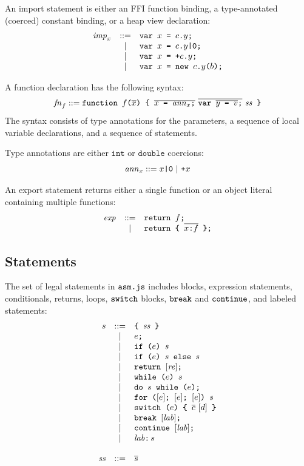 \documentclass{article}
\newcommand{\funcall}[2]{{#1}\mathjs{(}{#2}\mathjs{)}}
\newcommand{\seq}[1]{\overline{{#1}}}
\newcommand{\mathjs}[1]{\mbox{\texttt{{#1}}}}
\newcommand{\return}[1]{\mathjs{return }{#1}\mathjs{;}}
\newcommand{\fun}[3]{\mathjs{function }{#1}\mathjs{(}{#2}\mathjs{) \char123{} }{#3}\mathjs{ \char125{}}}
\newcommand{\var}[1]{\mathjs{var }{#1}\mathjs{;}}
\newcommand{\while}[2]{\mathjs{while (}{#1}\mathjs{) }{#2}}
\newcommand{\dowhile}[2]{\mathjs{do }{#1}\mathjs{ while (}{#2}\mathjs{);}}
\newcommand{\for}[4]{\mathjs{for (}{#1}\mathjs{; }{#2}\mathjs{; }{#3}\mathjs{) }{#4}}
\newcommand{\switch}[2]{\mathjs{switch (}{#1}\mathjs{) \char123{} }{#2}\mathjs{ \char125{}}}
\newcommand{\brkl}[1]{\mathjs{break }{#1}\mathjs{;}}
\newcommand{\contl}[1]{\mathjs{continue }{#1}\mathjs{;}}
\newcommand{\lab}[2]{{#1}\mathjs{:}\,{#2}}
\newcommand{\ifone}[2]{\mathjs{if (}{#1}\mathjs{) }{#2}}
\newcommand{\iftwo}[3]{\mathjs{if (}{#1}\mathjs{) }{#2}\mathjs{ else }{#3}}
\newcommand{\block}[1]{\mathjs{\char123{} }{#1}\mathjs{ \char125{}}}
\newcommand{\double}{\mathtt{double}}
\newcommand{\todouble}[1]{\mathjs{+}{#1}}
\renewcommand{\int}{\mathtt{int}}
\begin{document}
An import statement is either an FFI function binding, a
type-annotated (coerced) constant binding, or a heap view declaration:
\[
\begin{array}{rcl}
\mathit{imp}_x  & ::= & \var{x \mathjs{ = } c\mathjs{.}y} \\
                &  |  & \var{x \mathjs{ = } c\mathjs{.}y\mathjs{|0}} \\
                &  |  & \var{x \mathjs{ = } \mathjs{+}c\mathjs{.}y} \\
                &  |  & \var{x \mathjs{ = } \mathjs{new }\funcall{c\mathjs{.}y}{b}} \\
\end{array}
\]

A function declaration has the following syntax:
\[
\mathit{fn}_f ::= \fun{f}{\seq{x}}{\seq{x\mathjs{ = }\mathit{ann}_x\mathjs{;}}\ \seq{\var{\seq{y\mathjs{ = }v}}}\ \mathit{ss}}
\]
The syntax consists of type annotations for the parameters, a sequence
of local variable declarations, and a sequence of statements.

Type annotations are either $\int$ or $\double$ coercions:
\[
\mathit{ann}_x ::= x\mathjs{|0} ~|~ \todouble{x}
\]

An export statement returns either a single function or an object
literal containing multiple functions:
\[
\begin{array}{rcl}
\mathit{exp}    & ::= & \return{f} \\
                &  |  & \return{\mathjs{\char123{} } \seq{x \mathjs{:} f} \mathjs{ \char125{}}} \\
\end{array}
\]

\subsection{Statements}

The set of legal statements in $\mathjs{asm.js}$ includes blocks,
expression statements, conditionals, returns, loops, $\mathjs{switch}$
blocks, $\mathjs{break}$ and $\mathjs{continue}$, and labeled
statements:
\[
\begin{array}{rcl}
s & ::= & \block{\mathit{ss}} \\
  &  |  & e\mathjs{;} \\
  &  |  & \ifone{e}{s} \\
  &  |  & \iftwo{e}{s}{s} \\
  &  |  & \return{[\mathit{re}]} \\
  &  |  & \while{e}{s} \\
  &  |  & \dowhile{s}{e} \\
  &  |  & \for{[e]}{[e]}{[e]}{s} \\
  &  |  & \switch{e}{\seq{c}\ [d]} \\
  &  |  & \brkl{[\mathit{lab}]} \\
  &  |  & \contl{[\mathit{lab}]} \\
  &  |  & \lab{\mathit{lab}}{s} \\
\\
\mathit{ss} & ::= & \seq{s} \\
\end{array}
\]
\end{document}
